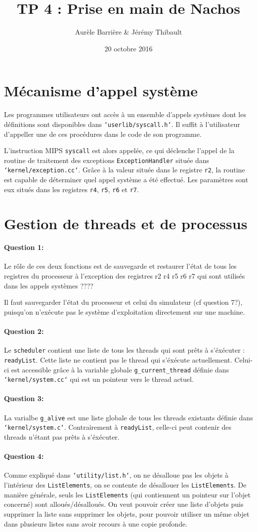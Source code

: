 \documentclass[11pt]{article}
\title{TP 4 : Prise en main de Nachos}
\author{Aurèle Barrière \& Jérémy Thibault}
\date{20 octobre 2016}
\def\question#1{\paragraph{Question #1:}}
\def\pathfile#1{\texttt{`#1`}}
\def\var#1{\texttt{#1}}
\def\func#1{\texttt{#1}}
\def\obj#1{\texttt{#1}}
\def\comment#1{\color{red}#1\color{black}}
\begin{document}
\maketitle

\section*{Mécanisme d'appel système}

Les programmes utilisateurs ont accès à un ensemble d'appels systèmes dont les définitions sont disponibles dans \pathfile{userlib/syscall.h}. Il suffit à l'utilisateur d'appeller une de ces procédures dans le code de son programme.

L'instruction MIPS \func{syscall} est alors appelée, ce qui déclenche l'appel de la routine de traitement des exceptions \func{ExceptionHandler} située dans \pathfile{kernel/exception.cc}. Grâce à la valeur située dans le registre \var{r2}, la routine est capable de déterminer quel appel système a été effectué. Les paramètres sont eux situés dans les registres \var{r4}, \var{r5}, \var{r6} et \var{r7}.


\section*{Gestion de threads et de processus}
\question{1} Le rôle de ces deux fonctions est de sauvegarde et restaurer l'état de tous les registres du processeur \comment{à l'exception des registres r2 r4 r5 r6 r7 qui sont utilisés dans les appels systèmes ????}

Il faut sauvegarder l'état du processeur et celui du simulateur \comment{(cf question 7?)}, puisqu'on n'exécute pas le système d'exploitation directement sur une machine.

\question{2} Le \obj{scheduler} contient une liste de tous les threads qui sont prêts à s'éxécuter : \var{readyList}. Cette liste ne contient pas le thread qui s'éxécute actuellement. Celui-ci est accessible grâce à la variable globale \var{g\_current\_thread} définie dans \pathfile{kernel/system.cc} qui est un pointeur vers le thread actuel.

\question{3} La varialbe \var{g\_alive} est une liste globale de tous les threads existants définie dans \pathfile{kernel/system.c}. Contrairement à \var{readyList}, celle-ci peut contenir des threads n'étant pas prêts à s'éxécuter.

\question{4} 
Comme expliqué dans \pathfile{utility/list.h}, on ne désalloue pas les objets à l'intérieur des \obj{ListElements}, on se contente de désallouer les \obj{ListElements}. De manière générale, seuls les \obj{ListElements} (qui contiennent un pointeur sur l'objet concerné) sont alloués/désalloués. On veut pouvoir créer une liste d'objets puis supprimer la liste sans supprimer les objets, pour pouvoir utiliser un même objet dans plusieurs listes sans avoir recours à une copie profonde.
\end{document}
